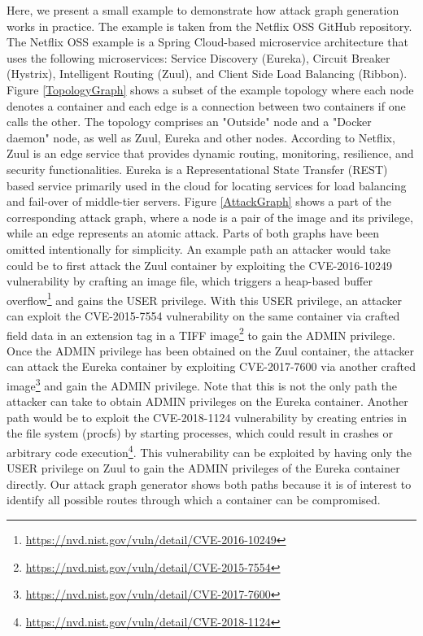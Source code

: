Here, we present a small example to demonstrate how attack graph generation works in practice. The example is taken from the Netflix OSS GitHub repository. The Netflix OSS example is a Spring Cloud-based microservice architecture that uses the following microservices: Service Discovery (Eureka), Circuit Breaker (Hystrix), Intelligent Routing (Zuul), and Client Side Load Balancing (Ribbon). Figure \ref{TopologyGraph} shows a subset of the example topology where each node denotes a container and each edge is a connection between two containers if one calls the other. The topology comprises an "Outside" node and a "Docker daemon" node, as well as Zuul, Eureka and other nodes. According to Netflix, Zuul is an edge service that provides dynamic routing, monitoring, resilience, and security functionalities. Eureka is a Representational State Transfer (REST) based service primarily used in the cloud for locating services for load balancing and fail-over of middle-tier servers. Figure \ref{AttackGraph} shows a part of the corresponding attack graph, where a node is a pair of the image and its privilege, while an edge represents an atomic attack. Parts of both graphs have been omitted intentionally for simplicity. An example path an attacker would take could be to first attack the Zuul container by exploiting the CVE-2016-10249 vulnerability by crafting an image file, which triggers a heap-based buffer overflow\footnote{\url{https://nvd.nist.gov/vuln/detail/CVE-2016-10249}} and gains the USER privilege.  With this USER privilege, an attacker can exploit the CVE-2015-7554 vulnerability on the same container via crafted field data in an extension tag in a TIFF image\footnote{\url{https://nvd.nist.gov/vuln/detail/CVE-2015-7554}} to gain the ADMIN privilege. Once the ADMIN privilege has been obtained on the Zuul container, the attacker can attack the Eureka container by exploiting CVE-2017-7600 via another crafted image\footnote{\url{https://nvd.nist.gov/vuln/detail/CVE-2017-7600}} and gain the ADMIN privilege. Note that this is not the only path the attacker can take to obtain ADMIN privileges on the Eureka container. Another path would be to exploit the CVE-2018-1124 vulnerability by creating entries in the file system (procfs) by starting processes, which could result in crashes or arbitrary code execution\footnote{\url{https://nvd.nist.gov/vuln/detail/CVE-2018-1124}}. This vulnerability can be exploited by having only the USER privilege on Zuul to gain the ADMIN privileges of the Eureka container directly. Our attack graph generator shows both paths because it is of interest to identify all possible routes through which a container can be compromised.




